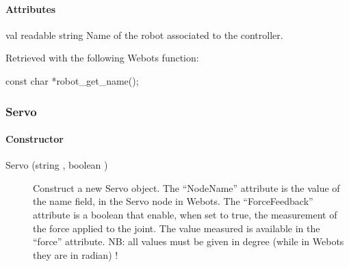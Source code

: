\paragraph{Attributes}

\noindent
\begin{itemize}
\begin{attribute}{val}
  {readable}
  {string}
  {}
  Name of the robot associated to the \urbi controller.

  Retrieved with the following Webots function:
\begin{cxx}
const char *robot_get_name();
\end{cxx}
\end{attribute}

\end{itemize}

\subsubsection{Servo}

\paragraph{Constructor}

\noindent
\begin{description}
\item[{Servo (string , boolean )}]
  Construct a new Servo object. The ``NodeName'' attribute is the
  value of the name field, in the Servo node in Webots. The
  ``ForceFeedback'' attribute is a boolean that enable, when set to
  true, the measurement of the force applied to the joint. The value
  measured is available in the ``force'' attribute.  NB: all values
  must be given in degree (while in Webots they are in radian) !
\end{description}

